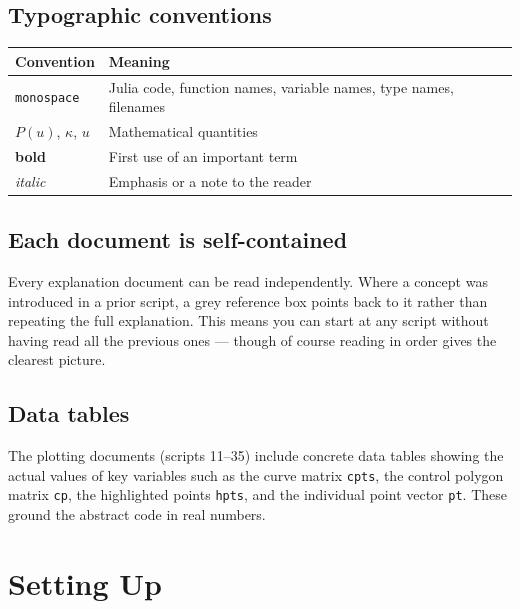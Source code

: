 \documentclass[12pt, a4paper]{article}
\newcommand{\cd}[1]{\texttt{#1}}
\begin{document}
\subsection{Typographic conventions}

\begin{center}
\begin{tabular}{lp{9cm}}
\toprule
Convention & Meaning \\
\midrule
\cd{monospace} & Julia code, function names, variable names,
  type names, filenames \\
$P(u)$, $\kappa$, $u$ & Mathematical quantities \\
\textbf{bold} & First use of an important term \\
\textit{italic} & Emphasis or a note to the reader \\
\bottomrule
\end{tabular}
\end{center}

\subsection{Each document is self-contained}

Every explanation document can be read independently.
Where a concept was introduced in a prior script,
a grey reference box points back to it rather than
repeating the full explanation.
This means you can start at any script without having
read all the previous ones --- though of course reading
in order gives the clearest picture.

\subsection{Data tables}

The plotting documents (scripts 11--35) include concrete
data tables showing the actual values of key variables
such as the curve matrix \cd{cpts}, the control polygon
matrix \cd{cp}, the highlighted points \cd{hpts},
and the individual point vector \cd{pt}.
These ground the abstract code in real numbers.


\section{Setting Up}
\end{document}
